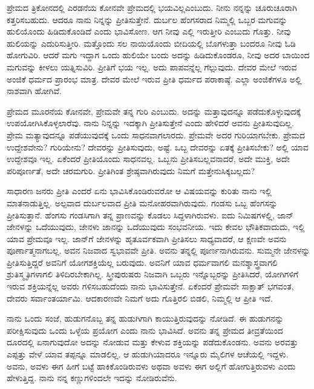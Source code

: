\vskip 3pt

ಪ್ರೇಮದ ತ್ರಿಕೋನದಲ್ಲಿ ಎರಡನೆಯ ಕೋನವೇ ಪ್ರೇಮದಲ್ಲಿ ಭಯವಿಲ್ಲ\break ಎಂಬುದು. ನೀನು ನನ್ನನ್ನು ಚೂರುಚೂರಾಗಿ ಕತ್ತರಿಸಬಹುದು. ಆದರೂ ನಾನು ನಿನ್ನನ್ನು ಪ್ರೀತಿಸುತ್ತೇನೆ. ದುರ್ಬಲ ಹೆಂಗಸರಾದ ನಿಮ್ಮಲ್ಲಿ ಒಬ್ಬರ ಮಗುವನ್ನು ಹುಲಿಯೊಂದು ಹಿಡಿದುಕೊಂಡಿದೆ ಎಂದು ಭಾವಿಸೋಣ. ಆಗ ನೀವು ಎಲ್ಲಿ ಇರುತ್ತೀರಿ ಎಂಬುದು ಗೊತ್ತು. ನೀವು ಹುಲಿಯನ್ನು ಎದುರಿಸುತ್ತೀರಿ. ಮತ್ತೊಂದು ಸಲ ನಾಯಿಯೊಂದು ಬೀದಿಯಲ್ಲಿ ಬೊಗಳುತ್ತಾ ಬಂದರೂ ನೀವು ಓಡಿ ಹೋಗುವಿರಿ. ಆದರೆ ಮಗು ಇದ್ದಾಗ ಒಂದು ಹುಲಿಯೇ ಬಂದು ಅದನ್ನು ಹಿಡಿದುಕೊಂಡರೂ, ನೀವು ಅದರ ಬಾಯಿಂದ ಮಗುವನ್ನು ಕೀಳಲು ಯತ್ನಿಸುವಿರಿ. ಪ್ರೀತಿಗೆ ಭಯ ಇಲ್ಲ. ಅದು ಪಾಪವನ್ನೆಲ್ಲ ಗೆಲ್ಲುವುದು. ದೇವರ ಮೇಲೆ ಇರುವ ಅಂಜಿಕೆ ಧರ್ಮದ ಪ್ರಾರಂಭ ಮಾತ್ರ. ದೇವರ ಮೇಲೆ ಇರುವ ಪ್ರೀತಿ ಧರ್ಮದ ಪರಾಕಾಷ್ಠೆ. ಎಲ್ಲಾ ಅಂಜಿಕೆಗಳೂ ಅಲ್ಲಿ ನಾಶವಾಗಿ ಹೋಗಿವೆ.

ಪ್ರೇಮದ ಮೂರನೆಯ ಕೋನವೇ, ಪ್ರೇಮವೇ ತನ್ನ ಗುರಿ ಎಂಬುದು. ಅದನ್ನು ಮತ್ತಾವುದನ್ನೂ ಪಡೆದುಕೊಳ್ಳುವುದಕ್ಕೆ ಉಪಯೋಗಿಸಿಕೊಳ್ಳಲಾರೆವು. ನಾನು ನಿನ್ನನ್ನು ಇದಕ್ಕಾಗಿ ಪ್ರೀತಿಸುತ್ತೇನೆ ಎಂದು ಹೇಳಿದರೆ ಅವನು ಪ್ರೀತಿಸುವುದಿಲ್ಲ. ಪ್ರೇಮ ಮತ್ಯಾವುದನ್ನೂ ಪಡೆಯುವುದಕ್ಕೆ ಒಂದು ಸಾಧನವಾಗಲಾರದು. ಪ್ರೇಮವೇ ಅದರ ಗುರಿಯಾಗಬೇಕು. ಪ್ರೇಮದ ಉದ್ದೇಶವೇನು? ಗುರಿಯೇನು? ದೇವರನ್ನು ಪ್ರೀತಿಸುವುದು, ಅಷ್ಟೆ. ಒಬ್ಬ ದೇವರನ್ನು ಏತಕ್ಕೆ ಪ್ರೀತಿಸಬೇಕು? ಅಲ್ಲಿ ಯಾವ ಉದ್ದೇಶವೂ ಇಲ್ಲ. ಏಕೆಂದರೆ ಪ್ರೀತಿಯೊಂದು ಸಾಧನವಲ್ಲ. ಒಬ್ಬನು ಪ್ರೀತಿಸಬಲ್ಲವನಾದರೆ, ಅದೇ ಮುಕ್ತಿ, ಅದೇ ಪರಿಪೂರ್ಣತೆ, ಅದೇ ಚರಮಗುರಿ. ಪ್ರೀತಿಗಿಂತ ಶ್ರೇಷ್ಠವಾಗಿರುವುದು ನಿಮಗೆ ಮತ್ತೇನು\break ಸಿಕ್ಕಬಲ್ಲದು?

ಸಾಧಾರಣ ಜನರು ಪ್ರೀತಿ ಎಂದರೆ ಏನು ಭಾವಿಸಿಕೊಂಡಿರುವರೋ ಆ ವಿಷಯವನ್ನು ಕುರಿತು ನಾನು ಇಲ್ಲಿ ಮಾತನಾಡುತ್ತಿಲ್ಲ. ಅಲ್ಪವಾದ ದುರ್ಬಲವಾದ ಪ್ರೀತಿ ಮನೋಹರವಾಗಿರುವುದು. ಗಂಡಸು ಒಬ್ಬ ಹೆಂಗಸನ್ನು ಪ್ರೀತಿಸುತ್ತಾನೆ. ಹೆಂಗಸು ಗಂಡಸಿಗಾಗಿ ತನ್ನ ಪ್ರಾಣವನ್ನು ಕೊಡಲು ಸಿದ್ದಳಾಗಿರುವಳು. ಐದು ನಿಮಿಷಗಳಲ್ಲಿ, ಜಾನ್ ಜೇನಳನ್ನು ಒದೆಯುವುದು, ಜೇನಳು ಜಾನನ್ನು ಒದೆಯುವುದು ಸಂಭವನೀಯ. ಇದು ಕೇವಲ ಭೌತಿಕವಾದುದು, ಇಲ್ಲಿ ಯಾವ ಪ್ರೇಮವೂ ಇಲ್ಲ. ಜಾನ್‌ಗೆ ಜೇನಳನ್ನು ಹೃತೂರ್ವಕವಾಗಿ ಪ್ರೀತಿಸಲು ಸಾಧ್ಯವಾದರೆ, ಆ ಕ್ಷಣವೇ ಅವನು ಪೂರ್ಣಾತ್ಮನಾಗಬಲ್ಲ. ಅವನ ನಿಜವಾದ ಸ್ವಭಾವವೇ ಪ್ರೀತಿ. ಅವನು ತನ್ನಲ್ಲಿ ಪೂರ್ಣನಾಗಿರುವನು. ಸುಮ್ಮನೇ ಜೇನಳನ್ನು ಪ್ರೀತಿಸುತ್ತಿದ್ದರೆ ಅವನಿಗೆ ಯೋಗಶಕ್ತಿಯೆಲ್ಲ ಬರುವುದು. ಅವನಿಗೆ ಯಾವ ಧರ್ಮವಾಗಲಿ ಮನಶ್ಶಾಸ್ತ್ರವಾಗಲಿ ಶ್ರುತಿಸ್ಮೃತಿಗಳಾಗಲಿ ತಿಳಿದಿರಬೇಕಾಗಿಲ್ಲ. ಸ್ತ್ರೀಪುರುಷರು ನಿಜವಾಗಿ ಒಬ್ಬರು ಇನ್ನೊಬ್ಬರನ್ನು ಪ್ರೀತಿಸಿದರೆ, ಯೋಗಿಗಳಿಗೆ ಇರುವ ಶಕ್ತಿಯನ್ನೆಲ್ಲ ಅವರು ಗಳಿಸಬಹುದೆಂದು ನಾನು ಭಾವಿಸುತ್ತೇನೆ. ಏಕೆಂದರೆ ಪ್ರೇಮವೇ ಸಾಕ್ಷಾತ್ ಭಗವಂತ, ದೇವರು ಸರ್ವಾಂತರ್ಯಾಮಿ. ಆದಕಾರಣವೇ ನಿಮಗೆ ಅದು ಗೊತ್ತಿರಲಿ ಬಿಡಲಿ, ನಿಮ್ಮಲ್ಲಿ ಆ ಪ್ರೀತಿ ಇದೆ.

ನಾನು ಒಂದು ಸಂಜೆ, ಹುಡುಗನೊಬ್ಬ ತನ್ನ ಹುಡುಗಿಗಾಗಿ ಕಾಯುತ್ತಿರುವುದನ್ನು ನೋಡಿದೆ. ಈ ಹುಡುಗನನ್ನು ಪರೀಕ್ಷಿಸುವುದು ಒಂದು ಒಳ್ಳೆಯ ಪ್ರಯೋಗ ಎಂದು ನಾನು ಭಾವಿಸಿದೆ. ಅವನು ತನ್ನ ಪ್ರೇಮದ ತೀವ್ರತೆಯಿಂದ ದೂರದಲ್ಲಿ ಏನಾಗುವುದೋ ಅದನ್ನು ನೋಡುವ ಮತ್ತು ಕೇಳುವ ಶಕ್ತಿಯನ್ನು ಪಡೆದುಕೊಂಡನು. ಅವನು ಅರವತ್ತು ಎಪ್ಪತ್ತು ವೇಳೆ ಯಾವ ತಪ್ಪನ್ನೂ ಮಾಡಲಿಲ್ಲ. ಆ ಹುಡುಗಿಯಾದರೂ ಇನ್ನೂರು ಮೈಲಿಗಳ ಆಚೆಯಲ್ಲಿ ಇದ್ದಳು. ಅವನು, ಅವಳು ಈಗ ಹೀಗೆ ಬಟ್ಟೆ ಹಾಕಿಕೊಂಡಿರುವಳು ಅಥವಾ ಅವಳು ಈಗ ಅಲ್ಲಿಗೆ ಹೋಗುತ್ತಿರುವಳು ಎಂದು ಹೇಳುತ್ತಿದ್ದ. ನಾನು ನನ್ನ ಕಣ್ಣುಗಳಿಂದಲೇ ಇದನ್ನು ನೋಡಿರುವೆನು.

